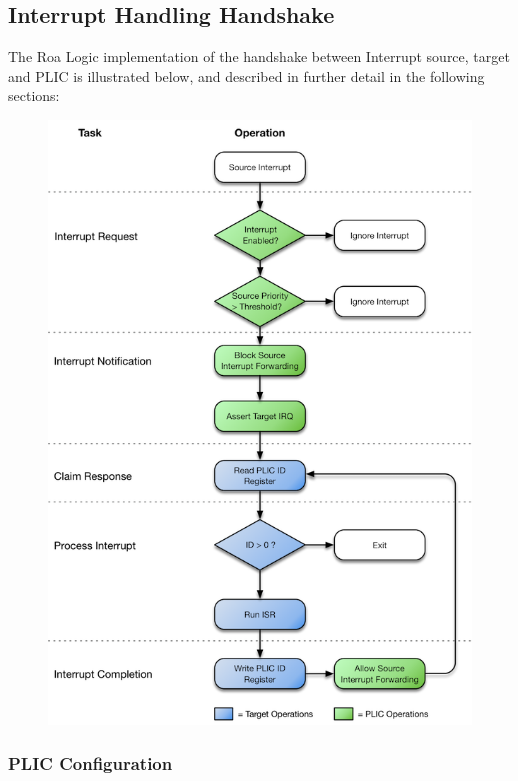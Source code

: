 \subsection{Interrupt Handling Handshake}

The Roa Logic implementation of the handshake between Interrupt source,
target and PLIC is illustrated below, and described in further detail in
the following sections:

\begin{figure}[h]
\centering
\includegraphics{../assets/graphics/AHB-Lite_PLIC_Handshake.png}
\caption{}
\end{figure}

\subsubsection{PLIC Configuration}

